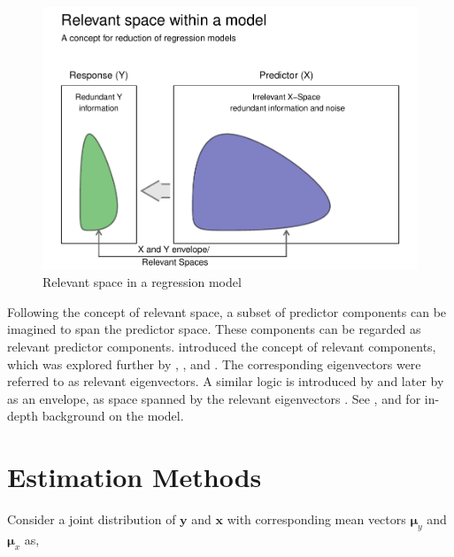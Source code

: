 \documentclass[12pt,3p,authoryear]{elsarticle}
\begin{document}
\begin{figure}

{\centering \includegraphics[width=0.8\linewidth]{Images/pdf/relevant-space-1} 

}

\caption{Relevant space in a regression model}\label{fig:relevant-space}
\end{figure}

Following the concept of relevant space, a subset of predictor
components can be imagined to span the predictor space. These components
can be regarded as relevant predictor components. \citet{Naes1985}
introduced the concept of relevant components, which was explored
further by \citet{helland1990partial}, \citet{naes1993relevant},
\citet{Helland1994b} and \citet{Helland2000}. The corresponding
eigenvectors were referred to as relevant eigenvectors. A similar logic
is introduced by \citet{cook2010envelope} and later by
\citet{cook2013envelopes} as an envelope, as space spanned by the
relevant eigenvectors \citep[p.101]{cook2018envelope}. See
\citet{Rimal2018}, \citet{saebo2015simrel} and \citet{rimal2019pred} for
in-depth background on the model.

\hypertarget{estimation-methods}{\section{Estimation
Methods}\label{estimation-methods}}

Consider a joint distribution of \(\mathbf{y}\) and \(\mathbf{x}\) with
corresponding mean vectors \(\boldsymbol{\mu}_y\) and
\(\boldsymbol{\mu}_x\) as,
\end{document}
